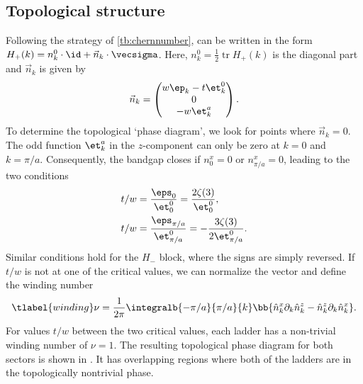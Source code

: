 \subsection{Topological structure}


Following the strategy of \cref{tb:chernnumber},  can be written in the form $H_+(k) = n^0_k \cdot \id + \vec{n}_k \cdot \vecsigma$. Here, $n^0_k = \frac{1}{2} \operatorname{tr} H_+(k)$ is the diagonal part and $\vec{n}_k$ is given by
\begin{align}
    \vec{n}_k = \begin{pmatrix}
        w \ep_k - t \et^0_k \\
        0 \\
        -w \et^a_k
    \end{pmatrix}.
\end{align}
To determine the topological `phase diagram', we look for points where $\vec{n}_k=0$.
The odd function $\et^a_k$ in the $z$-component can only be zero at $k = 0$ and $k=\pi/a$.
Consequently, the bandgap closes if $n^x_0 = 0$ or $n^x_{\pi/a} = 0$, leading to the two conditions
\begin{align}
    t/w  &= \frac{\eps_0}{\et^0_0} = \frac{2\zeta(3)}{\et^0_0}, \\
    t/w  &= \frac{\eps_{\pi/a}}{\et^0_{\pi/a}} = - \frac{3 \zeta(3)}{2 \et^0_{\pi/a}}.
\end{align}
Similar conditions hold for the $H_-$ block, where the signs are simply reversed.
If $t/w$ is not at one of the critical values, we can normalize the vector and define the winding number
\begin{align} \tlabel{winding}
    \nu = \frac{1}{2\pi} \integralb{-\pi/a}{\pi/a}{k} \bb{ \hat{n}^x_k \partial_k \hat{n}^z_k - \hat{n}^z_k \partial_k \hat{n}^x_k }.
\end{align}
For values $t/w$ between the two critical values, each ladder has a non-trivial winding number of $\nu = 1$.
The resulting topological phase diagram for both sectors is shown in .
It has overlapping regions where both of the ladders are in the topologically nontrivial phase.


